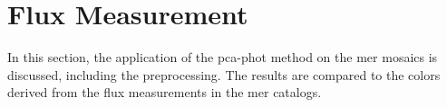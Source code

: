 \newpage
\section{Flux Measurement}

In this section, the application of the \gls{pca-phot} method on the \gls{mer} mosaics is discussed, including the preprocessing. The results are compared to the colors derived from the flux measurements in the \gls{mer} catalogs. 


